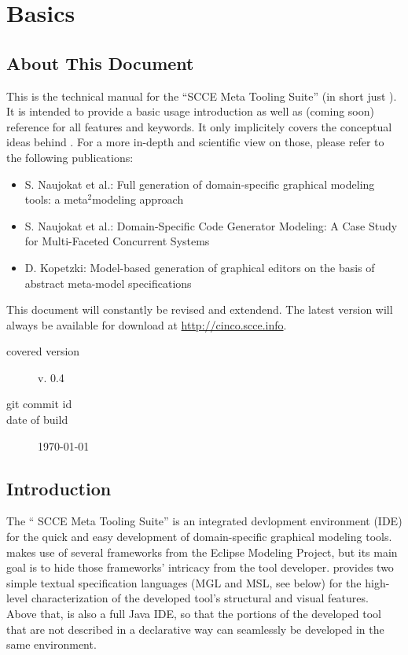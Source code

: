 \documentclass[a4paper,american,12pt]{scrreprt}
\begin{document}
\chapter{Basics}

\section{About This Document}

This is the technical manual for the ``\cinco SCCE Meta Tooling Suite'' (in
short just \cinco). It is intended to provide a basic usage introduction as
well as (coming soon) reference for all features and keywords. It only implicitely covers the
conceptual ideas behind \cinco. For a more in-depth and scientific view on those,
please refer to the following publications:
%
\begin{itemize}
\item S. Naujokat et al.: Full generation of domain-specific graphical modeling tools: a
meta$^2$modeling approach \cite{NaLSKM2014}
\item S. Naujokat et al.: Domain-Specific Code Generator Modeling: A Case Study for
Multi-Faceted Concurrent Systems \cite{NaTISL2014}
\item D. Kopetzki: Model-based generation of graphical editors on
the basis of abstract meta-model specifications \cite{Kopetz2014}
\end{itemize}

This document will constantly be revised and extendend. The latest version will
always be available for download at \url{http://cinco.scce.info}. 

\begin{description}
\item[covered version] \cinco v. 0.4
\item[git commit id] \gitAbbrevHash{}
\item[date of build] \today
\end{description}

\section{Introduction}

The ``\cinco{} SCCE Meta Tooling Suite'' is an integrated devlopment environment
(IDE) for the quick and easy development of domain-specific graphical modeling
tools. \cinco{} makes use of several frameworks from the Eclipse Modeling
Project, but its main goal is to hide those frameworks' intricacy from the
tool developer. \cinco{} provides two simple textual specification languages (MGL and
MSL, see below) for the high-level characterization of the developed tool's
structural and visual features. Above that, \cinco{} is also a full Java IDE, so
that the portions of the developed tool that are not described in a declarative
way can seamlessly be developed in the same environment.
\end{document}

